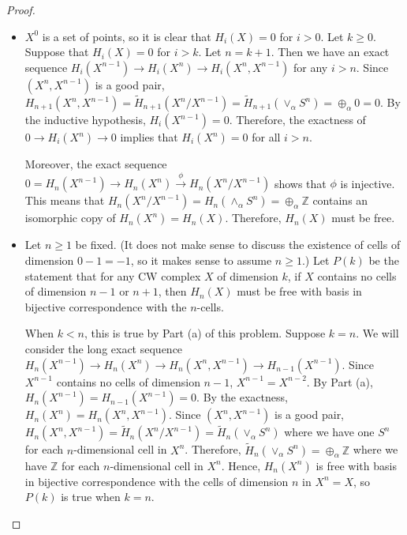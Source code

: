 \documentclass[12pt, psamsfonts]{amsart}
\theoremstyle{definition}
\theoremstyle{remark}
\numberwithin{equation}{section}
\begin{document}
\begin{proof}
$ $
  \begin{itemize}
    \item
      $X^0$ is a set of points, so it is clear that $H_i(X) = 0$ for $i > 0$.
      Let $k \geq 0$.
      Suppose that $H_i(X) = 0$ for $i > k$.
      Let $n = k + 1$.
      Then we have an exact sequence $H_{i}(X^{n - 1}) \rightarrow H_{i}(X^n) \rightarrow H_{i}(X^n, X^{n - 1})$ for any $i > n$.
      Since $(X^n, X^{n - 1})$ is a good pair, $H_{n + 1}(X^n, X^{n - 1}) = \tilde{H}_{n + 1}(X^n / X^{n - 1}) = \tilde{H}_{n + 1}(\vee_{\alpha} S^n) = \oplus_{\alpha} 0 = 0$.
      By the inductive hypothesis, $H_i(X^{n - 1}) = 0$.
      Therefore, the exactness of $0 \rightarrow H_i(X^n) \rightarrow 0$ implies that $H_i(X^n) = 0$ for all $i > n$.

      Moreover, the exact sequence $0 = H_n(X^{n - 1}) \rightarrow H_n(X^n) \xrightarrow{\phi} H_n(X^n / X^{n - 1})$ shows that $\phi$ is injective.
      This means that $H_n(X^n / X^{n - 1}) = H_n(\wedge_{\alpha} S^n) = \oplus_{\alpha} \mathbb{Z}$ contains an isomorphic copy of $H_n(X^n) = H_n(X)$.
      Therefore, $H_n(X)$ must be free.
    \item
      Let $n \geq 1$ be fixed.
      (It does not make sense to discuss the existence of cells of dimension $0 - 1 = -1$, so it makes sense to assume $n \geq 1$.)
      Let $P(k)$ be the statement that for any CW complex $X$ of dimension $k$, if $X$ contains no cells of dimension $n - 1$ or $n + 1$, then $H_n(X)$ must be free with basis in bijective correspondence with the $n$-cells.

      When $k < n$, this is true by Part (a) of this problem.
      Suppose $k = n$.
      We will consider the long exact sequence $H_n(X^{n - 1}) \rightarrow H_n(X^n) \rightarrow H_n(X^n, X^{n - 1}) \rightarrow H_{n - 1}(X^{n - 1})$.
      Since $X^{n - 1}$ contains no cells of dimension $n - 1$, $X^{n - 1} = X^{n - 2}$.
      By Part (a), $H_n(X^{n - 1}) = H_{n - 1}(X^{n - 1}) = 0$.
      By the exactness, $H_n(X^n) = H_n(X^n, X^{n - 1})$.
      Since $(X^n, X^{n - 1})$ is a good pair, $H_n(X^n, X^{n - 1}) = \tilde{H}_n(X^n / X^{n - 1}) = \tilde{H}_n(\vee_{\alpha} S^n)$ where we have one $S^n$ for each $n$-dimensional cell in $X^n$.
      Therefore, $\tilde{H}_n(\vee_{\alpha} S^n) = \oplus_{\alpha} \mathbb{Z}$ where we have $\mathbb{Z}$ for each $n$-dimensional cell in $X^n$.
      Hence, $H_n(X^n)$ is free with basis in bijective correspondence with the cells of dimension $n$ in $X^n = X$, so $P(k)$ is true when $k = n$.


\end{itemize}
\end{proof}
\end{document}
